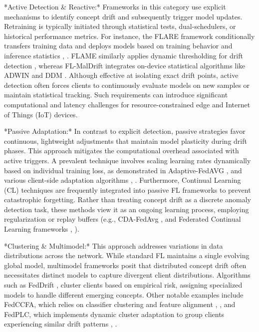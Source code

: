 \documentclass[journal]{IEEEtran}
\begin{document}
*Active Detection \& Reactive:* Frameworks in this category use explicit mechanisms to identify concept drift and subsequently trigger model updates. Retraining is typically initiated through statistical tests, dual-schedulers, or historical performance metrics. For instance, the FLARE framework conditionally transfers training data and deploys models based on training behavior and inference statistics \cite{Chow2023}, \cite{Chow2023a}. FLAME similarly applies dynamic thresholding for drift detection \cite{Mavromatis2024}, whereas FL-MalDrift integrates on-device statistical algorithms like ADWIN and DDM \cite{Patel2025}. Although effective at isolating exact drift points, active detection often forces clients to continuously evaluate models on new samples or maintain statistical tracking. Such requirements can introduce significant computational and latency challenges for resource-constrained edge and Internet of Things (IoT) devices.

*Passive Adaptation:* In contrast to explicit detection, passive strategies favor continuous, lightweight adjustments that maintain model plasticity during drift phases. This approach mitigates the computational overhead associated with active triggers. A prevalent technique involves scaling learning rates dynamically based on individual training loss, as demonstrated in Adaptive-FedAVG \cite{Canonaco2021a}, \cite{Canonaco2021} and various client-side adaptation algorithms \cite{Saile2024a}, \cite{Saile2024}. Furthermore, Continual Learning (CL) techniques are frequently integrated into passive FL frameworks to prevent catastrophic forgetting. Rather than treating concept drift as a discrete anomaly detection task, these methods view it as an ongoing learning process, employing regularization or replay buffers (e.g., CDA-FedAvg \cite{Casado2021a}, \cite{Casado2021} and Federated Continual Learning frameworks \cite{Hamedi2025}, \cite{Benameur2025}).

*Clustering \& Multimodel:* This approach addresses variations in data distributions across the network. While standard FL maintains a single evolving global model, multimodel frameworks posit that distributed concept drift often necessitates distinct models to capture divergent client distributions. Algorithms such as FedDrift \cite{Jothimurugesan2022}, \cite{Jothimurugesan2022a} cluster clients based on empirical risk, assigning specialized models to handle different emerging concepts. Other notable examples include FedCCFA, which relies on classifier clustering and feature alignment \cite{Chen2024}, \cite{Chen2024a}, and FedPLC, which implements dynamic cluster adaptation to group clients experiencing similar drift patterns \cite{Zhou2026}, \cite{Zhou2026a}.
\end{document}
